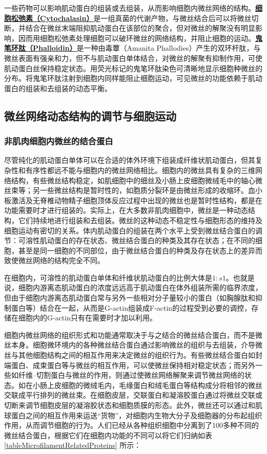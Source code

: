 一些药物可以影响肌动蛋白的组装或去组装，从而影响细胞内微丝网络的结构。\textbf{\underline{细胞松弛素（Cytochalasin）}}是一组真菌的代谢产物，与微丝结合后可以将微丝切断，并结合在微丝末端阻抑肌动蛋白在该部位的聚合，但对微丝的解聚没有明显影响，因而用细胞松弛素处理细胞可以破环微丝的网络结构，并阻止细胞的运动。\textbf{\underline{鬼笔环肽（Phalloidin）}}是一种由毒蕈（Amanita Phallodies）产生的双环杆肽，与微丝表面有强亲和力，但不与肌动蛋白单体结合，对微丝的解聚有抑制作用，可使肌动蛋白丝保持稳定状态。用荧光标记的鬼笔环肽染色可清晰地显示细胞种微丝的分布。将鬼笔环肽注射到细胞内同样能阻止细胞运动，可见微丝的功能依赖于肌动蛋白的组装和去组装的动态平衡。

\subsection{微丝网络动态结构的调节与细胞运动}

\subsubsection{非肌肉细胞内微丝的结合蛋白}

尽管纯化的肌动蛋白单体可以在合适的体外环境下组装成纤维状肌动蛋白，但其复杂性和有序性都远不能与细胞内的微丝网络相比。细胞内的微丝具有复杂的三维网络结构，有些微丝结构稳定，如肌细胞中的细丝及小肠上皮细胞微绒毛中的轴心微丝束等；另一些微丝结构是暂时性的，如胞质分裂环是由微丝形成的收缩环。血小板激活及无脊椎动物精子细胞顶体反应过程中出现的微丝也是暂时性结构，都是在功能需要时才进行组装的。实际上，在大多数非肌肉细胞中，微丝是一种动态结构，它们持续地进行组装和去组装。微丝的这种动态不稳定性与细胞形态的维持及细胞运动有密切的关系。体内肌动蛋白的组装在两个水平上受到微丝结合蛋白的调节：可溶性肌动蛋白的存在状态、微丝结合蛋白的种类及其存在状态；在不同的细胞，甚至是同一细胞的不同部位，由于微丝结合蛋白的种类及存在状态上的差异而致使微丝网络的结构完全不同。

在细胞内，可溶性的肌动蛋白单体和纤维状肌动蛋白的比例大体是$ 1:s1 $。也就是说，细胞内游离态肌动蛋白的浓度远远高于肌动蛋白在体外组装所需的临界浓度，但由于细胞内游离态肌动蛋白常与另外一些相对分子量较小的蛋白（如胸腺肽和抑制蛋白等）结合在一起，从而是G-actin组装成F-actin的过程受到必要的调控，存储在细胞内的G-actin只有在需要时才加以利用。

细胞内微丝网络的组织形式和功能通常取决于与之结合的微丝结合蛋白，而不是微丝本身。细胞微环境内的各种微丝结合蛋白通过影响微丝的组织与去组装，介导微丝与其他细胞结构之间的相互作用来决定微丝的组织行为。有些微丝结合蛋白如封端蛋白、成束蛋白等与微丝的相互作用，可以使微丝保持相对稳定状态；而另外一些如纤维--切割蛋白与微丝的作用，则通过使微丝网络解聚来调节微丝网络的状态。如在小肠上皮细胞的微绒毛内，毛缘蛋白和绒毛蛋白等结构成分将相邻的微丝交联成平行排列的微丝束。在细胞皮层，交联蛋白和凝溶胶蛋白通过将微丝交联或切断来调节细胞皮层的凝溶胶状态和细胞质膜的形态。此外，微丝还可以通过和肌球蛋白之间的相互作用来运送``货物''，对细胞内生物大分子及细胞器的分布起组织作用，从而调节细胞的行为。人们已经从各种组织细胞中分离到了100多种不同的微丝结合蛋白，根据它们在细胞内功能的不同可以将它们归纳如表 \ref{tableMicrofilamentRelatedProteins} 所示：


